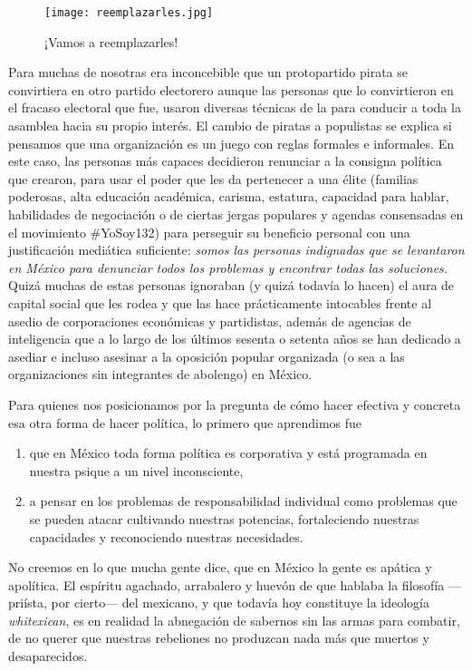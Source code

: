 \begin{figure}[htbp]
	\centering
	\texttt{[image: reemplazarles.jpg]}
	\caption{¡Vamos a reemplazarles!}
	\label{fig:reemplazo}
\end{figure}

Para muchas de nosotras era inconcebible que un protopartido pirata se convirtiera en otro partido electorero aunque las personas que lo convirtieron en el fracaso electoral que fue, usaron diversas técnicas de la  para conducir a toda la asamblea hacia su propio interés. El cambio de piratas a populistas se explica si pensamos que una organización es un juego con reglas formales e informales. En este caso, las personas más capaces decidieron renunciar a la consigna política que crearon, para usar el poder que les da pertenecer a una élite (familias poderosas, alta educación académica, carisma, estatura, capacidad para hablar, habilidades de negociación o de ciertas jergas populares y agendas consensadas en el movimiento \#YoSoy132) para perseguir su beneficio personal con una justificación mediática suficiente: \emph{somos las personas indignadas que se levantaron en México para denunciar todos los problemas y encontrar todas las soluciones.} Quizá muchas de estas personas ignoraban (y quizá todavía lo hacen) el aura de capital social que les rodea y que las hace prácticamente intocables frente al asedio de corporaciones económicas y partidistas, además de agencias de inteligencia que a lo largo de los últimos sesenta o setenta años se han dedicado a asediar e incluso asesinar a la oposición popular organizada (o sea a las organizaciones sin integrantes de abolengo) en México.

Para quienes nos posicionamos por la pregunta de cómo hacer efectiva y concreta esa otra forma de hacer política, lo primero que aprendimos fue
\begin{enumerate}
	\item que en México toda forma política es corporativa y está programada en nuestra psique a un nivel  inconsciente,
	\item a pensar en los problemas de responsabilidad individual como problemas que se pueden atacar cultivando nuestras potencias, fortaleciendo nuestras capacidades y reconociendo nuestras necesidades.
\end{enumerate}

No creemos en lo que mucha gente dice, que en México la gente es apática y apolítica. El espíritu agachado, arrabalero y huevón de que hablaba la filosofía ---priísta, por cierto--- del mexicano, y que todavía hoy constituye la ideología \emph{whitexican}, es en realidad la abnegación de sabernos sin las armas para combatir, de no querer que nuestras rebeliones no produzcan nada más que muertos y desaparecidos.

